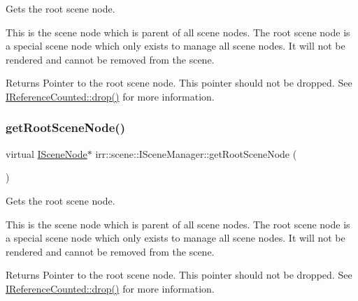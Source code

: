 Gets the root scene node. 

This is the scene node which is parent of all scene nodes. The root scene node is a special scene node which only exists to manage all scene nodes. It will not be rendered and cannot be removed from the scene. \begin{DoxyReturn}{Returns}
Pointer to the root scene node. This pointer should not be dropped. See \hyperlink{classirr_1_1IReferenceCounted_a03856a09355b89d178090c4a5f738543}{I\+Reference\+Counted\+::drop()} for more information. 
\end{DoxyReturn}
\mbox{\label{classirr_1_1scene_1_1ISceneManager_a4f7075320f1a3bf2838f29c23f78635f}} 
\subsubsection{\texorpdfstring{get\+Root\+Scene\+Node()}{getRootSceneNode()}\hspace{0.1cm}{\footnotesize\ttfamily [2/2]}}
{\footnotesize\ttfamily virtual \hyperlink{classirr_1_1scene_1_1ISceneNode}{I\+Scene\+Node}$\ast$ irr\+::scene\+::\+I\+Scene\+Manager\+::get\+Root\+Scene\+Node (\begin{DoxyParamCaption}{ }\end{DoxyParamCaption})\hspace{0.3cm}{\ttfamily [pure virtual]}}



Gets the root scene node. 

This is the scene node which is parent of all scene nodes. The root scene node is a special scene node which only exists to manage all scene nodes. It will not be rendered and cannot be removed from the scene. \begin{DoxyReturn}{Returns}
Pointer to the root scene node. This pointer should not be dropped. See \hyperlink{classirr_1_1IReferenceCounted_a03856a09355b89d178090c4a5f738543}{I\+Reference\+Counted\+::drop()} for more information. 
\end{DoxyReturn}
\mbox{\label{classirr_1_1scene_1_1ISceneManager_a433b65bfc974d069a1dc2fc296b23d9b}} 
